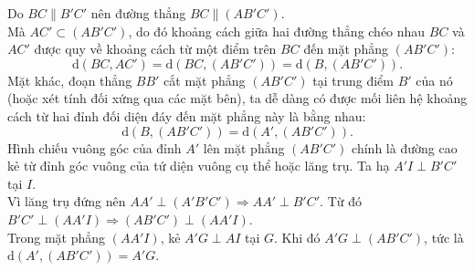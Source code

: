 \begin{ex}
{\begin{itemchoice}
\begin{center}
		\end{center}
		
		Do $BC \parallel B'C'$ nên đường thẳng $BC \parallel (AB'C')$. \\
		Mà $AC' \subset (AB'C')$, do đó khoảng cách giữa hai đường thẳng chéo nhau $BC$ và $AC'$ được quy về khoảng cách từ một điểm trên $BC$ đến mặt phẳng $(AB'C')$:
		$$\mathrm{d}(BC, AC') = \mathrm{d}(BC, (AB'C')) = \mathrm{d}(B, (AB'C')).$$
		Mặt khác, đoạn thẳng $BB'$ cắt mặt phẳng $(AB'C')$ tại trung điểm $B'$ của nó (hoặc xét tính đối xứng qua các mặt bên), ta dễ dàng có được mối liên hệ khoảng cách từ hai đỉnh đối diện đáy đến mặt phẳng này là bằng nhau:
		$$\mathrm{d}(B, (AB'C')) = \mathrm{d}(A', (AB'C')).$$
		Hình chiếu vuông góc của đỉnh $A'$ lên mặt phẳng $(AB'C')$ chính là đường cao kẻ từ đỉnh góc vuông của tứ diện vuông cụ thể hoặc lăng trụ. Ta hạ $A'I \perp B'C'$ tại $I$. \\
		Vì lăng trụ đứng nên $AA' \perp (A'B'C') \Rightarrow AA' \perp B'C'$. Từ đó $B'C' \perp (AA'I) \Rightarrow (AB'C') \perp (AA'I)$. \\
		Trong mặt phẳng $(AA'I)$, kẻ $A'G \perp AI$ tại $G$. Khi đó $A'G \perp (AB'C')$, tức là $\mathrm{d}(A', (AB'C')) = A'G$.
		

\end{itemchoice}}
\end{ex}
